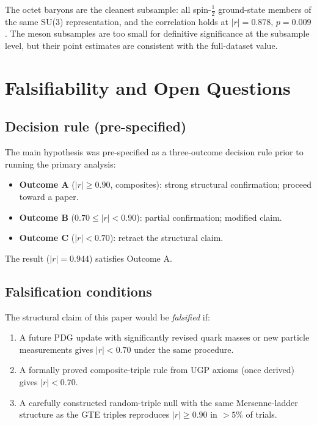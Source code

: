 \documentclass[12pt,a4paper]{article}
\begin{document}
The octet baryons are the cleanest subsample: all spin-$\frac{1}{2}$
ground-state members of the same SU(3) representation, and the correlation
holds at $|r| = 0.878$, $p = 0.009$.
The meson subsamples are too small for definitive significance at the
subsample level, but their point estimates are consistent with the
full-dataset value.

\section{Falsifiability and Open Questions}
\label{sec:falsifiability}

\subsection{Decision rule (pre-specified)}

The main hypothesis was pre-specified as a three-outcome decision rule
prior to running the primary analysis:
\begin{itemize}[leftmargin=2em]
  \item \textbf{Outcome A} ($|r| \geq 0.90$, composites):
    strong structural confirmation; proceed toward a paper.
  \item \textbf{Outcome B} ($0.70 \leq |r| < 0.90$):
    partial confirmation; modified claim.
  \item \textbf{Outcome C} ($|r| < 0.70$):
    retract the structural claim.
\end{itemize}
The result ($|r| = 0.944$) satisfies Outcome A.

\subsection{Falsification conditions}

The structural claim of this paper would be \emph{falsified} if:

\begin{enumerate}[leftmargin=2em]
  \item A future PDG update with significantly revised quark masses or
    new particle measurements gives $|r| < 0.70$ under the same procedure.
  \item A formally proved composite-triple rule from UGP axioms (once
    derived) gives $|r| < 0.70$.
  \item A carefully constructed random-triple null with the same
    Mersenne-ladder structure as the GTE triples reproduces
    $|r| \geq 0.90$ in $> 5\%$ of trials.
\end{enumerate}
\end{document}
